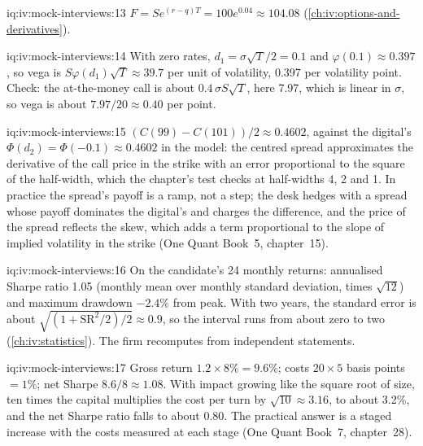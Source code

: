 \begin{solution}{iq:iv:mock-interviews:13}
$F = S e^{(r - q)T} = 100 e^{0.04} \approx 104.08$ (\cref{ch:iv:options-and-derivatives}).
\end{solution}

\begin{solution}{iq:iv:mock-interviews:14}
With zero rates, $d_1 = \sigma\sqrt T/2 = 0.1$ and $\varphi(0.1) \approx 0.397$, so vega is $S\varphi(d_1)\sqrt T \approx 39.7$ per
unit of volatility, 0.397 per volatility point. Check: the at-the-money call is about $0.4\,\sigma S\sqrt T$, here 7.97, which is
linear in $\sigma$, so vega is about $7.97/20 \approx 0.40$ per point.
\end{solution}

\begin{solution}{iq:iv:mock-interviews:15}
$(C(99) - C(101))/2 \approx 0.4602$, against the digital's $\Phi(d_2) = \Phi(-0.1) \approx 0.4602$ in the model: the centred spread
approximates the derivative of the call price in the strike with an error proportional to the square of the half-width, which the
chapter's test checks at half-widths 4, 2 and 1. In practice the spread's payoff is a ramp, not a step; the desk hedges with a spread
whose payoff dominates the digital's and charges the difference, and the price of the spread reflects the skew, which adds a term
proportional to the slope of implied volatility in the strike (One Quant Book~5, chapter~15).
\end{solution}

\begin{solution}{iq:iv:mock-interviews:16}
On the candidate's 24 monthly returns: annualised Sharpe ratio 1.05 (monthly mean over monthly standard deviation, times
$\sqrt{12}$) and maximum drawdown $-2.4\%$ from peak. With two years, the standard error is about $\sqrt{(1 + \mathrm{SR}^2/2)/2}
\approx 0.9$, so the interval runs from about zero to two (\cref{ch:iv:statistics}). The firm recomputes from independent statements.
\end{solution}

\begin{solution}{iq:iv:mock-interviews:17}
Gross return $1.2 \times 8\% = 9.6\%$; costs $20 \times 5$ basis points $= 1\%$; net Sharpe $8.6/8 \approx 1.08$. With impact
growing like the square root of size, ten times the capital multiplies the cost per turn by $\sqrt{10} \approx 3.16$, to about
3.2\%, and the net Sharpe ratio falls to about 0.80. The practical answer is a staged increase with the costs measured at each stage
(One Quant Book~7, chapter~28).
\end{solution}

